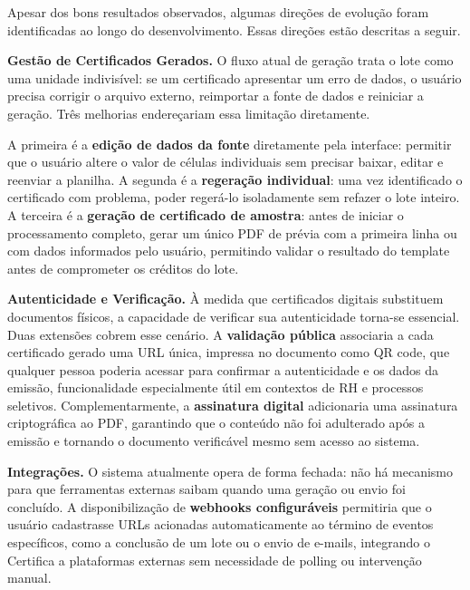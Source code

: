 \documentclass[article,a4paper,12pt,brazil,sumario=tradicional]{abntex2}
\begin{document}
Apesar dos bons resultados observados, algumas direções de evolução foram identificadas ao longo do desenvolvimento. Essas direções estão descritas a seguir.

\vspace{3mm}\noindent\textbf{Gestão de Certificados Gerados.}
%
O fluxo atual de geração trata o lote como uma unidade indivisível: se um certificado apresentar um erro de dados, o usuário precisa corrigir o arquivo externo, reimportar a fonte de dados e reiniciar a geração. Três melhorias endereçariam essa limitação diretamente.

A primeira é a \textbf{edição de dados da fonte} diretamente pela interface: permitir que o usuário altere o valor de células individuais sem precisar baixar, editar e reenviar a planilha. A segunda é a \textbf{regeração individual}: uma vez identificado o certificado com problema, poder regerá-lo isoladamente sem refazer o lote inteiro. A terceira é a \textbf{geração de certificado de amostra}: antes de iniciar o processamento completo, gerar um único PDF de prévia com a primeira linha ou com dados informados pelo usuário, permitindo validar o resultado do template antes de comprometer os créditos do lote.

\vspace{3mm}\noindent\textbf{Autenticidade e Verificação.}
%
À medida que certificados digitais substituem documentos físicos, a capacidade de verificar sua autenticidade torna-se essencial. Duas extensões cobrem esse cenário. A \textbf{validação pública} associaria a cada certificado gerado uma URL única, impressa no documento como QR code, que qualquer pessoa poderia acessar para confirmar a autenticidade e os dados da emissão, funcionalidade especialmente útil em contextos de RH e processos seletivos. Complementarmente, a \textbf{assinatura digital} adicionaria uma assinatura criptográfica ao PDF, garantindo que o conteúdo não foi adulterado após a emissão e tornando o documento verificável mesmo sem acesso ao sistema.

\vspace{3mm}\noindent\textbf{Integrações.}
%
O sistema atualmente opera de forma fechada: não há mecanismo para que ferramentas externas saibam quando uma geração ou envio foi concluído. A disponibilização de \textbf{webhooks configuráveis} permitiria que o usuário cadastrasse URLs acionadas automaticamente ao término de eventos específicos, como a conclusão de um lote ou o envio de e-mails, integrando o Certifica a plataformas externas sem necessidade de polling ou intervenção manual.
\end{document}
